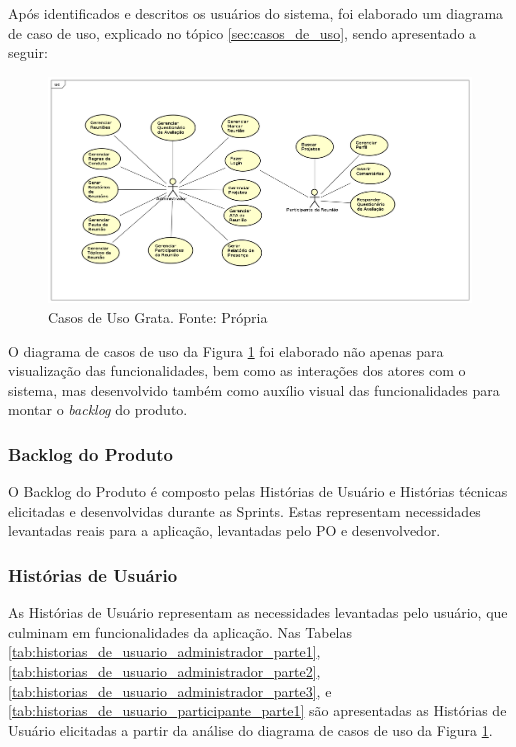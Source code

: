 Após identificados e descritos os usuários do sistema, foi elaborado um diagrama de caso de uso, explicado no tópico \ref{sec:casos_de_uso}, sendo apresentado a seguir:

\begin{figure}[H]
	\centering
	\includegraphics[width=1.0\textwidth]{figuras/casosDeUso.png}
	\caption{Casos de Uso Grata. Fonte: Própria}
	\label{img:casos_de_uso_grata}
\end{figure}

O diagrama de casos de uso da Figura \ref{img:casos_de_uso_grata} foi elaborado não apenas para visualização das funcionalidades, bem como as interações dos atores com o sistema, mas desenvolvido também como auxílio visual das funcionalidades para montar o \textit{backlog} do produto.

\subsubsection{Backlog do Produto}

O Backlog do Produto é composto pelas Histórias de Usuário e Histórias técnicas
elicitadas e desenvolvidas durante as Sprints. Estas representam necessidades levantadas reais para a aplicação, levantadas pelo PO e desenvolvedor.

\subsubsection{Histórias de Usuário}

As Histórias de Usuário representam as necessidades levantadas pelo usuário, que culminam em funcionalidades da aplicação. Nas Tabelas \ref{tab:historias_de_usuario_administrador_parte1}, \ref{tab:historias_de_usuario_administrador_parte2}, \ref{tab:historias_de_usuario_administrador_parte3}, e \ref{tab:historias_de_usuario_participante_parte1} são apresentadas as Histórias de Usuário elicitadas a partir da análise do diagrama de casos de uso da Figura \ref{img:casos_de_uso_grata}. 

